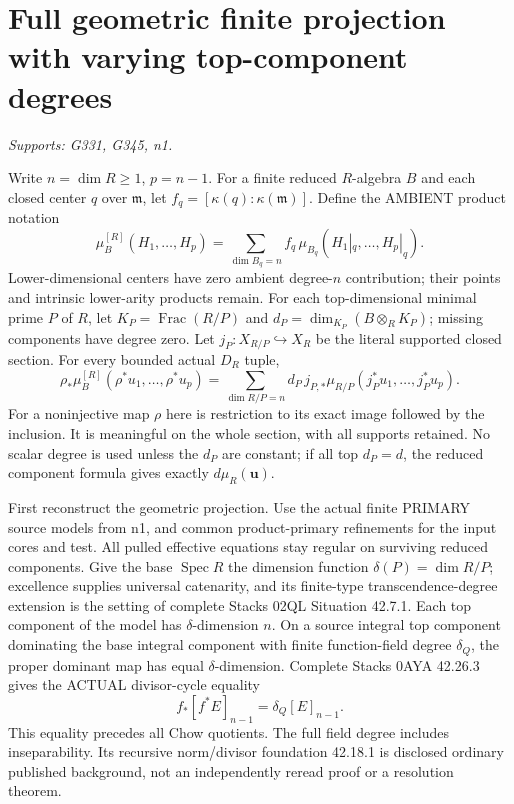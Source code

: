 \section{Full geometric finite projection with varying top-component degrees}
\textit{Supports: G331, G345, n1.}

Write $n=\dim R\ge1$, $p=n-1$. For a finite reduced $R$-algebra $B$ and each closed center $q$ over $\mathfrak m$, let $f_q=[\kappa(q):\kappa(\mathfrak m)]$. Define the AMBIENT product notation
\[
\mu_B^{[R]}(H_1,\ldots,H_p)=
\sum_{\dim B_q=n} f_q\,\mu_{B_q}(H_1|_q,\ldots,H_p|_q).
\]
Lower-dimensional centers have zero ambient degree-$n$ contribution; their points and intrinsic lower-arity products remain. For each top-dimensional minimal prime $P$ of $R$, let $K_P=\operatorname{Frac}(R/P)$ and
$d_P=\dim_{K_P}(B\otimes_R K_P)$; missing components have degree zero. Let $j_P:X_{R/P}\hookrightarrow X_R$ be the literal supported closed section. For every bounded actual $D_R$ tuple,
\[
\rho_*\mu_B^{[R]}(\rho^*u_1,\ldots,\rho^*u_p)
=\sum_{\dim R/P=n}d_P\,j_{P,*}\mu_{R/P}(j_P^*u_1,\ldots,j_P^*u_p). \tag{18}
\]
For a noninjective map $\rho$ here is restriction to its exact image followed by the inclusion. It is meaningful on the whole section, with all supports retained. No scalar degree is used unless the $d_P$ are constant; if all top $d_P=d$, the reduced component formula gives exactly $d\mu_R(\boldsymbol u)$.

First reconstruct the geometric projection. Use the actual finite PRIMARY source models from n1, and common product-primary refinements for the input cores and test. All pulled effective equations stay regular on surviving reduced components. Give the base $\operatorname{Spec}R$ the dimension function $\delta(P)=\dim R/P$; excellence supplies universal catenarity, and its finite-type transcendence-degree extension is the setting of complete Stacks 02QL Situation 42.7.1. Each top component of the model has $\delta$-dimension $n$. On a source integral top component dominating the base integral component with finite function-field degree $\delta_Q$, the proper dominant map has equal $\delta$-dimension. Complete Stacks 0AYA 42.26.3 gives the ACTUAL divisor-cycle equality
\[
f_*[f^*E]_{n-1}=\delta_Q[E]_{n-1}.                   \tag{19}
\]
This equality precedes all Chow quotients. The full field degree includes inseparability. Its recursive norm/divisor foundation 42.18.1 is disclosed ordinary published background, not an independently reread proof or a resolution theorem.

